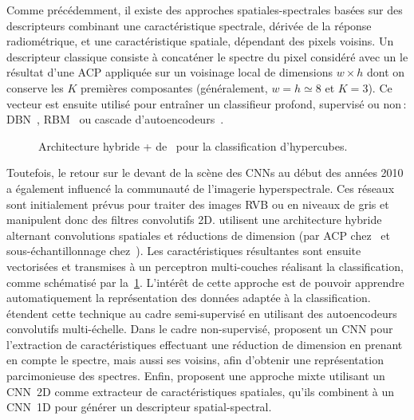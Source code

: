 Comme précédemment, il existe des approches spatiales-spectrales basées sur des descripteurs combinant une caractéristique spectrale, dérivée de la réponse radiométrique, et une caractéristique spatiale, dépendant des pixels voisins. Un descripteur classique consiste à concaténer le spectre du pixel considéré avec un le résultat d'une \gls{ACP} appliquée sur un voisinage local de dimensions $w\times h$ dont on conserve les $K$ premières composantes (généralement, $w = h \simeq 8$ et $K = 3$). Ce vecteur est ensuite utilisé pour entraîner un classifieur profond, supervisé ou non\,: \gls{DBN}~\cite{li_classification_2014,chen_spectral-spatial_2015}, \gls{RBM}~\cite{lin_spectral-spatial_2013,midhun_deep_2014} ou cascade d'autoencodeurs~\cite{chen_deep_2014,ma_spectral-spatial_2016,tao_unsupervised_2015,wang_spectralspatial_2017}.

\begin{figure}[h]
  \resizebox{\textwidth}{!}{}
  \caption[Architecture hybride + pour la classification d'hypercubes.]{Architecture hybride + de~\citet{makantasis_deep_2015} pour la classification d'hypercubes.}
  \label{fig:pcacnn}
\end{figure}

Toutefois, le retour sur le devant de la scène des \glspl{CNN} au début des années 2010 a également influencé la communauté de l'imagerie hyperspectrale. Ces réseaux sont initialement prévus pour traiter des images \gls{RVB} ou en niveaux de gris et manipulent donc des filtres convolutifs 2D. \citet{makantasis_deep_2015,slavkovikj_hyperspectral_2015} utilisent une architecture hybride alternant convolutions spatiales et réductions de dimension (par \gls{ACP} chez~\citet{makantasis_deep_2015} et sous-échantillonnage chez~\citet{slavkovikj_hyperspectral_2015}). Les caractéristiques résultantes sont ensuite vectorisées et transmises à un perceptron multi-couches réalisant la classification, comme schématisé par la~\cref{fig:pcacnn}. L'intérêt de cette approche est de pouvoir apprendre automatiquement la représentation des données adaptée à la classification. \citet{zhao_combining_2015} étendent cette technique au cadre semi-supervisé en utilisant des autoencodeurs convolutifs multi-échelle. Dans le cadre non-supervisé, \citet{romero_unsupervised_2015} proposent un \gls{CNN} pour l'extraction de caractéristiques effectuant une réduction de dimension en prenant en compte le spectre, mais aussi ses voisins, afin d'obtenir une représentation parcimonieuse des spectres. Enfin, \citet{zhao_spectral-spatial_2016,yue_spectral-spatial_2015} proposent une approche mixte utilisant un \gls{CNN}~2D comme extracteur de caractéristiques spatiales, qu'ils combinent à un \gls{CNN}~1D pour générer un descripteur spatial-spectral.


